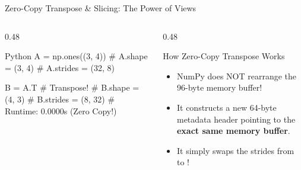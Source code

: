 \begin{frame}[fragile]{Zero-Copy Transpose \& Slicing: The Power of Views}
  \begin{columns}[T,onlytextwidth]
    \begin{column}{0.48\textwidth}
      \begin{CodeBlock}{Python}
A = np.ones((3, 4))
# A.shape   = (3, 4)
# A.strides = (32, 8)

B = A.T  # Transpose!
# B.shape   = (4, 3)
# B.strides = (8, 32)
# Runtime: 0.0000s (Zero Copy!)
      \end{CodeBlock}
    \end{column}
    \begin{column}{0.48\textwidth}
      \begin{ConceptBox}{How Zero-Copy Transpose Works}
        \scriptsize
        \begin{itemize}\setlength{\itemsep}{0.08cm}
          \item NumPy does NOT rearrange the 96-byte memory buffer!
          \item It constructs a new 64-byte metadata header pointing to the \textbf{exact same memory buffer}.
          \item It simply swaps the strides from  to !
        \end{itemize}
      \end{ConceptBox}
    \end{column}
  \end{columns}
  \vspace{0.15cm}
\end{frame}

